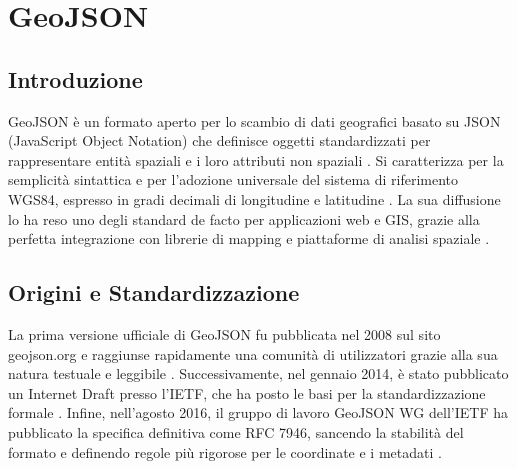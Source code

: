 \chapter{GeoJSON}

\section{Introduzione}
GeoJSON è un formato aperto per lo scambio di dati geografici basato su JSON (JavaScript
Object Notation) che definisce oggetti standardizzati per rappresentare entità
spaziali e i loro attributi non spaziali \cite{rfc7946}. Si caratterizza per la semplicità
sintattica e per l'adozione universale del sistema di riferimento WGS84,
espresso in gradi decimali di longitudine e latitudine \cite{rfc7946}. La sua diffusione
lo ha reso uno degli standard de facto per applicazioni web e GIS, grazie alla
perfetta integrazione con librerie di mapping e piattaforme di analisi spaziale
\cite{geojson-spec}.

\section{Origini e Standardizzazione}
La prima versione ufficiale di GeoJSON fu pubblicata nel 2008 sul sito geojson.org
e raggiunse rapidamente una comunità di utilizzatori grazie alla sua natura
testuale e leggibile \cite{geojson-first}. Successivamente, nel gennaio 2014, è stato
pubblicato un Internet Draft presso l'IETF, che ha posto le basi per la
standardizzazione formale \cite{geojson-first}. Infine, nell'agosto 2016, il gruppo
di lavoro GeoJSON WG dell'IETF ha pubblicato la specifica definitiva come RFC 7946,
sancendo la stabilità del formato e definendo regole più rigorose per le
coordinate e i metadati \cite{rfc7946}.

